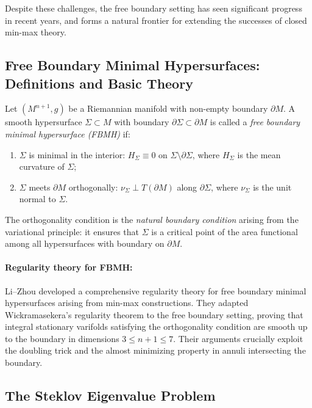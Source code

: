 Despite these challenges, the free boundary setting has seen significant progress in recent years,
and forms a natural frontier for extending the successes of closed min-max theory.

\subsection{Free Boundary Minimal Hypersurfaces: Definitions and Basic Theory}

\begin{definition}
Let $(M^{n+1}, g)$ be a Riemannian manifold with non-empty boundary $\partial M$. A smooth
hypersurface $\Sigma \subset M$ with boundary $\partial \Sigma \subset \partial M$ is called a
\emph{free boundary minimal hypersurface (FBMH)} if:
\begin{enumerate}
    \item $\Sigma$ is minimal in the interior: $H_\Sigma \equiv 0$ on $\Sigma \setminus \partial \Sigma$,
    where $H_\Sigma$ is the mean curvature of $\Sigma$;

    \item $\Sigma$ meets $\partial M$ orthogonally: $\nu_\Sigma \perp T(\partial M)$ along
    $\partial \Sigma$, where $\nu_\Sigma$ is the unit normal to $\Sigma$.
\end{enumerate}
\end{definition}

The orthogonality condition is the \emph{natural boundary condition} arising from the variational
principle: it ensures that $\Sigma$ is a critical point of the area functional among all
hypersurfaces with boundary on $\partial M$.

\paragraph{Regularity theory for FBMH:}
Li--Zhou \cite{LZ17} developed a comprehensive regularity theory for free boundary minimal
hypersurfaces arising from min-max constructions. They adapted Wickramasekera's regularity theorem
\cite{Wic14} to the free boundary setting, proving that integral stationary varifolds satisfying
the orthogonality condition are smooth up to the boundary in dimensions $3 \leq n+1 \leq 7$. Their
arguments crucially exploit the doubling trick and the almost minimizing property in annuli
intersecting the boundary.

\subsection{The Steklov Eigenvalue Problem}\label{subsec:steklov}

